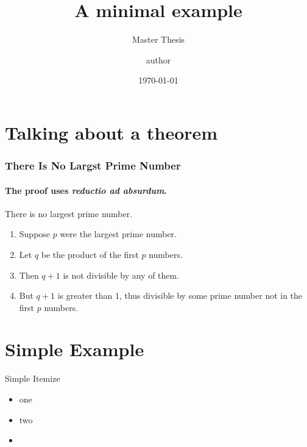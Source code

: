 \documentclass{beamer}
\title{A minimal example}
\date{\today}
\author{author}
\subtitle{Master Thesis}
\begin{document}
\maketitle


\section[Theorem]{Talking about a theorem}
\begin{frame} 
\frametitle{There Is No Largst Prime Number} 
\framesubtitle{The proof uses \textit{reductio ad absurdum}.} 
\begin{theorem}
There is no largest prime number. \end{theorem} 
\begin{enumerate} 
\item<1-| alert@1> Suppose $p$ were the largest prime number. 
\item<2-> Let $q$ be the product of the first $p$ numbers. 
\item<3-> Then $q+1$ is not divisible by any of them. 
\item<1-> But $q + 1$ is greater than $1$, thus divisible by some prime
number not in the first $p$ numbers. 
\end{enumerate}
\end{frame}
\section{Simple Example}
\begin{frame}{Simple Itemize}
\begin{itemize}
\item one
\item two
\item \inserttotalframenumber
\end{itemize}
\end{frame}




\end{document}
